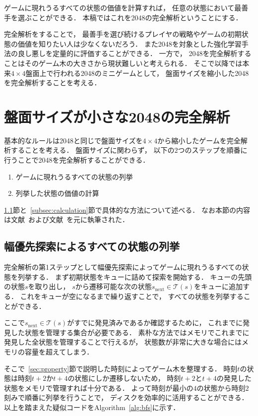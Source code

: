 ゲームに現れうるすべての状態の価値を計算すれば， 任意の状態において最善手を選ぶことができる．
本稿ではこれを2048の完全解析ということにする．

完全解析をすることで， 最善手を選び続けるプレイヤの戦略やゲームの初期状態の価値を知りたい人は少なくないだろう．
また2048を対象とした強化学習手法の良し悪しを定量的に評価することができる．
一方で， 2048を完全解析することはそのゲーム木の大きさから現状難しいと考えられる．
そこで以降では本来$4\times4$盤面上で行われる2048のミニゲームとして， 盤面サイズを縮小した2048を完全解析することを考える．

\section{盤面サイズが小さな2048の完全解析}
\label{sec:mini2048}
基本的なルールは2048と同じで盤面サイズを$4\times4$から縮小したゲームを完全解析することを考える．
盤面サイズに関わらず， 以下の$2$つのステップを順番に行うことで2048を完全解析することができる．

\begin{enumerate}
    \item ゲームに現れうるすべての状態の列挙
    \item 列挙した状態の価値の計算
\end{enumerate}

\ref{subsec:enumeration}節と~\ref{subsec:calculation}節で具体的な方法について述べる．
なお本節の内容は文献~\cite{3x3_2048}および文献~\cite{4x3_2048}を元に執筆された．

\subsection{幅優先探索によるすべての状態の列挙}
\label{subsec:enumeration}
完全解析の第1ステップとして幅優先探索によってゲームに現れうるすべての状態を列挙する．
まず初期状態をキューに詰めて探索を開始する．
キューの先頭の状態$s$を取り出し， $s$から遷移可能な次の状態$s_{\text{next}} \in \mathcal{T}(s)$をキューに追加する．
これをキューが空になるまで繰り返すことで， すべての状態を列挙することができる．

ここで$s_{\text{next}} \in \mathcal{T}(s)$がすでに発見済みであるか確認するために， これまでに発見した状態を管理する集合が必要である．
素朴な方法ではメモリでこれまでに発見した全状態を管理することで行えるが， 状態数が非常に大きな場合にはメモリの容量を超えてしまう．

そこで~\ref{sec:property}節で説明した時刻によってゲーム木を整理する．
時刻$t$の状態は時刻$t+2$か$t+4$の状態にしか遷移しないため， 時刻$t+2$と$t+4$の発見した状態をメモリで管理すれば十分である．
よって時刻が最小の$4$の状態から時刻$2$刻みで順番に列挙を行うことで， ディスクを効率的に活用することができる．
以上を踏まえた疑似コードをAlgorithm~\ref{alg:bfs}に示す．

